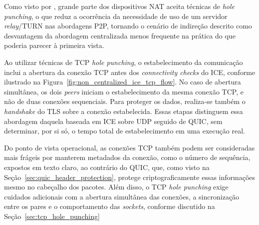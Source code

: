 Como visto por \citep{ford2005peer}, grande parte dos dispositivos NAT aceita técnicas de \textit{hole punching}, o que reduz a ocorrência da necessidade de uso de um servidor \textit{relay}/TURN nas abordagens P2P, tornando o cenário de indireção descrito como desvantagem da abordagem centralizada menos frequente na prática do que poderia parecer à primeira vista.

Ao utilizar técnicas de TCP \textit{hole punching}, o estabelecimento da comunicação inclui a abertura da conexão TCP antes dos \textit{connectivity checks} do ICE, conforme ilustrado na Figura~\ref{fig:non_centralized_ice_tcp_flow}. No caso de abertura simultânea, os dois \textit{peers} iniciam o estabelecimento da mesma conexão TCP, e não de duas conexões sequenciais. Para proteger os dados, realiza-se também o \textit{handshake} do TLS sobre a conexão estabelecida. Essas etapas distinguem essa abordagem daquela baseada em ICE sobre UDP seguido de QUIC, sem determinar, por si só, o tempo total de estabelecimento em uma execução real.

Do ponto de vista operacional, as conexões TCP também podem ser consideradas mais frágeis por manterem metadados da conexão, como o número de sequência, expostos em texto claro, ao contrário do QUIC, que, como visto na Seção~\ref{sec:quic_header_protection}, protege criptograficamente essas informações mesmo no cabeçalho dos pacotes. Além disso, o TCP \textit{hole punching} exige cuidados adicionais com a abertura simultânea das conexões, a sincronização entre os pares e o comportamento das \textit{sockets}, conforme discutido na Seção~\ref{sec:tcp_hole_punching}